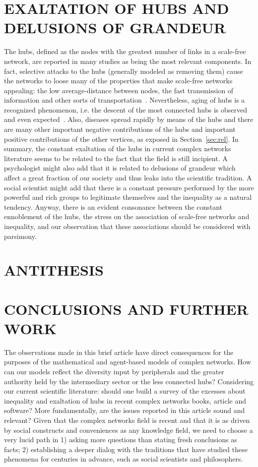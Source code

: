 \documentclass[12pt,fleqn]{article}
\begin{document}
\section{EXALTATION OF HUBS AND DELUSIONS OF GRANDEUR}\label{sec:delusion}
The hubs, defined as the nodes with the greatest number of links in a scale-free network,
are reported in many studies as being the most relevant components.
In fact, selective attacks to the hubs (generally modeled as removing them)
cause the networks to loose many of the properties that make scale-free networks
appealing: the low average-distance between nodes, the fast transmission of information
and other sorts of transportation~\citep{networks}.
Nevertheless, aging of hubs is a recognized phenomenon,
i.e. the descent of the most connected hubs is observed
and even expected~\citep{aging}.
Also, diseases spread rapidly by means of the hubs 
and there are many other important negative contributions
of the hubs and important positive contributions of the
other vertices, as exposed in Section~\ref{sec:rel}.
In summary, the constant exaltation of the hubs in current
complex networks literature seems to be related to the
fact that the field is still incipient.
A psychologist might also add that it is related to
delusions of grandeur which affect a great fraction of
our society and thus leaks into the scientific tradition.
A social scientist might add that there is a constant
pressure performed by the more powerful and rich groups
to legitimate themselves and the inequality as a natural tendency.
Anyway, there is an evident consonance between the
constant ennoblement of the hubs, the stress on the association
of scale-free networks and inequality,
and our observation that these associations should be
considered with parsimony.


\section{ANTITHESIS}\label{sec:anti}

\section{CONCLUSIONS AND FURTHER WORK}\label{sec:con}
The observations made in this brief article have direct consequences for
the purposes of the mathematical and agent-based models of complex networks.
How can our models reflect the diversity input by peripherals
and the greater authority held by the intermediary sector or the less connected hubs?
Considering our current scientific literature:
should one build a survey of the
excesses about inequality and exaltation of hubs in recent complex networks books, article and software?
More fundamentally, are the issues reported in this article sound
and relevant?
Given that the complex networks field is recent and that it is as driven
by social constructs and conveniences as any knowledge field,
we need to choose a very lucid path
in 1) asking more questions than stating fresh conclusions as facts;
2) establishing a deeper dialog with the traditions that have studied
these phenomena for centuries in advance, such as social scientists and philosophers.
\end{document}
